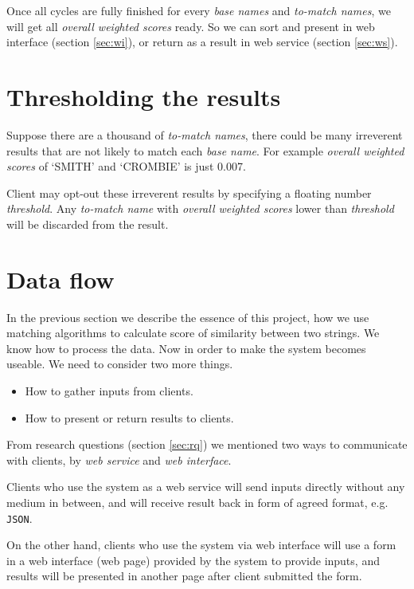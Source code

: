 Once all cycles are fully finished for every \emph{base names} and
\emph{to-match names}, we will get all \emph{overall weighted scores}
ready. So we can sort and present in web interface (section \ref{sec:wi}), or return
as a result in web service (section \ref{sec:ws}).

\section{Thresholding the results}
\label{sec:threshold}

Suppose there are a thousand of \emph{to-match names}, there could be
many irreverent results that are not likely to match each
\emph{base name}. For example \emph{overall weighted scores} of
`SMITH' and `CROMBIE' is just 0.007.

Client may opt-out these irreverent results by specifying
a floating number \emph{threshold}.
Any \emph{to-match name} with \emph{overall weighted scores}
lower than \emph{threshold} will be discarded from the result.

\section{Data flow}
\label{sec:mcv}

In the previous section we describe the essence of this project,
how we use matching algorithms to calculate score of similarity
between two strings. We know how to process the data.
Now in order to make the system becomes useable.
We need to consider two more things.

\begin{itemize}
  \item How to gather inputs from clients.
  \item How to present or return results to clients.
\end{itemize}

From research questions (section \ref{sec:rq}) we mentioned
two ways to communicate with clients, by \emph{web service} and
\emph{web interface}.

Clients who use the system as a web service
will send inputs directly without any medium in between, and will
receive result back in form of agreed format, e.g. \texttt{JSON}.

On the other hand, clients who use the system via web interface
will use a form in a web interface (web page) provided by the system to provide
inputs, and results will be presented in another page
after client submitted the form.

